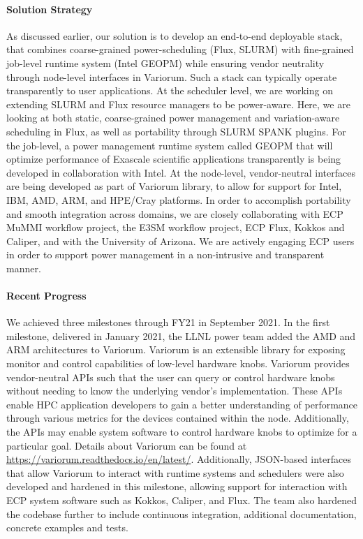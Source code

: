 \paragraph{Solution Strategy}
As discussed earlier, our solution is to develop an end-to-end deployable stack, that combines coarse-grained power-scheduling (Flux, SLURM) with fine-grained job-level runtime system (Intel GEOPM) while ensuring vendor neutrality through node-level interfaces in Variorum. Such a stack can typically operate transparently to user applications. At the scheduler level, we are working on extending SLURM and Flux resource managers to be power-aware. Here, we are looking at both static, coarse-grained power management and variation-aware scheduling in Flux, as well as portability through SLURM SPANK plugins. For the job-level, a power management runtime system called GEOPM that will optimize performance of Exascale scientific applications transparently is being developed in collaboration with Intel. At the node-level, vendor-neutral interfaces are being developed as part of Variorum library, to allow for support for Intel, IBM, AMD, ARM, and HPE/Cray platforms. In order to accomplish portability and smooth integration across domains, we are closely collaborating with ECP MuMMI workflow project, the E3SM workflow project, ECP Flux, Kokkos and Caliper, and with the University of Arizona. We are actively engaging ECP users in order to support power management in a non-intrusive and transparent manner. 

\paragraph{Recent Progress}
We achieved three milestones through FY21 in September 2021. In the first milestone, delivered in January 2021, the LLNL power team added the AMD and ARM architectures to Variorum. Variorum is an extensible library for exposing monitor and control capabilities of low-level hardware knobs. Variorum provides vendor-neutral APIs such that the user can query or control hardware knobs without needing to know the underlying vendor’s implementation. These APIs enable HPC application developers to gain a better understanding of performance through various metrics for the devices contained within the node. Additionally, the APIs may enable system software to control hardware knobs to optimize for a particular goal. Details about Variorum can be found at \url{https://variorum.readthedocs.io/en/latest/}. Additionally, JSON-based interfaces that allow Variorum to interact with runtime systems and schedulers were also developed and hardened in this milestone, allowing support for interaction with ECP system software such as Kokkos, Caliper, and Flux. The team also hardened the codebase further to include continuous integration, additional documentation, concrete examples and tests.

